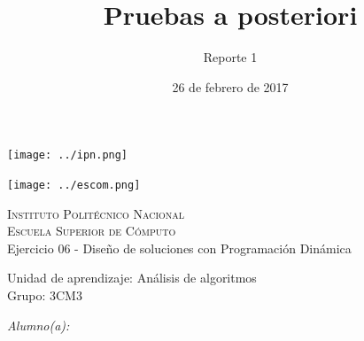 \documentclass[12pt]{article}
\date{26 de febrero de 2017}
\title{Pruebas a posteriori}
\author{Reporte 1}
\begin{document}
\begin{titlepage}
            \begin{center}
                \noindent
                \begin{minipage}{0.5\textwidth}
                    \begin{flushleft} \large
                        \texttt{[image: ../ipn.png]}
                    \end{flushleft}
                \end{minipage}%
                \begin{minipage}{0.55\textwidth}
                    \begin{flushright} \large
                        \texttt{[image: ../escom.png]}
                    \end{flushright}
                \end{minipage}
                
                \textsc{\LARGE Instituto Politécnico Nacional}\\[0.5cm]
                
                \textsc{\Large Escuela Superior de Cómputo}\\[1cm]
                
                
                { \huge Ejercicio 06 - Diseño de soluciones con Programación Dinámica \\[1cm] }
                
                { \Large Unidad de aprendizaje: Análisis de algoritmos} \\[1cm]
                
                { \Large Grupo: 3CM3 } \\[1cm]
                
                \noindent
                \begin{minipage}{0.5\textwidth}
                    \begin{flushleft} \large
                        \emph{Alumno(a):}\\
                        

\end{flushleft}
\end{minipage}
\end{center}
\end{titlepage}
\end{document}
